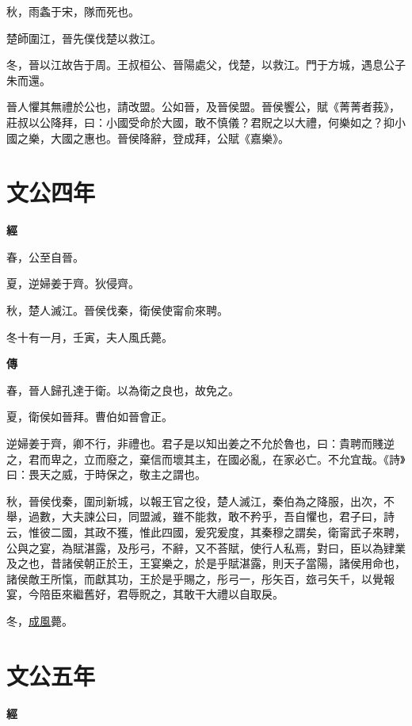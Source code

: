 \documentclass{ctexart}
\begin{document}
秋，雨螽于宋，隊而死也。

楚師圍江，晉先僕伐楚以救江。

冬，晉以江故告于周。王叔桓公、晉陽處父，伐楚，以救江。門于方城，遇息公子朱而還。

晉人懼其無禮於公也，請改盟。公如晉，及晉侯盟。晉侯饗公，賦《菁菁者莪》，莊叔以公降拜，曰：小國受命於大國，敢不慎儀？君貺之以大禮，何樂如之？抑小國之樂，大國之惠也。晉侯降辭，登成拜，公賦《嘉樂》。





\section{文公四年}


\textbf{經}



春，公至自晉。

夏，逆婦姜于齊。狄侵齊。

秋，楚人滅江。晉侯伐秦，衛侯使甯俞來聘。

冬十有一月，壬寅，夫人風氏薨。

\textbf{傳}



春，晉人歸孔達于衛。以為衛之良也，故免之。

夏，衛侯如晉拜。曹伯如晉會正。

逆婦姜于齊，卿不行，非禮也。君子是以知出姜之不允於魯也，曰：貴聘而賤逆之，君而卑之，立而廢之，棄信而壞其主，在國必亂，在家必亡。不允宜哉。《詩》曰：畏天之威，于時保之，敬主之謂也。

秋，晉侯伐秦，圍刓新城，以報王官之役，楚人滅江，秦伯為之降服，出次，不舉，過數，大夫諫公曰，同盟滅，雖不能救，敢不矜乎，吾自懼也，君子曰，詩云，惟彼二國，其政不獲，惟此四國，爰究爰度，其秦穆之謂矣，衛甯武子來聘，公與之宴，為賦湛露，及彤弓，不辭，又不荅賦，使行人私焉，對曰，臣以為肄業及之也，昔諸侯朝正於王，王宴樂之，於是乎賦湛露，則天子當陽，諸侯用命也，諸侯敵王所愾，而獻其功，王於是乎賜之，彤弓一，彤矢百，玈弓矢千，以覺報宴，今陪臣來繼舊好，君辱貺之，其敢干大禮以自取戾。

冬，\underline{成風}薨。





\section{文公五年}


\textbf{經}
\end{document}
